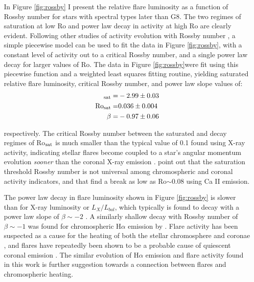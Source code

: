 \documentclass[twocolumn]{aastex6}
\begin{document}
In Figure \ref{fig:rossby} I present the relative flare luminosity as a function of Rossby number for stars with spectral types later than G8. The two regimes of saturation at low Ro and power law decay in activity at high Ro are clearly evident. Following other studies of activity evolution with Rossby number \citet[e.g.][]{wright2011}, a simple piecewise model can be used to fit the data in Figure \ref{fig:rossby}, with a constant level of activity out to a critical Rossby number, and a single power law decay for larger values of Ro. The data in Figure \ref{fig:rossby}were fit using this piecewise function and a weighted least squares fitting routine, yielding saturated relative flare luminosity, critical Rossby number, and power law slope values of:
\begin{eqnarray}
[\log (L_{fl} L_{Kp}^{-1})]_{\rm sat} =& -2.99 \pm 0.03 \notag \\
\rm{Ro_{sat}} =& 0.036 \pm 0.004 \notag \\
\beta = & -0.97 \pm 0.06 
\end{eqnarray}

\noindent
respectively. The critical Rossby number between the saturated and decay regimes of Ro$_{\rm sat}$ is much smaller than the typical value of 0.1 found using X-ray activity, indicating stellar flares become coupled to a star's angular momentum evolution {\it sooner} than the coronal X-ray emission \citep{pizzolato2003}. \citet{wright2011} point out that the saturation threshold Rossby number is not universal among chromospheric and coronal activity indicators, and that \citet{marsden2009} find a break as low as Ro$\sim$0.08 using Ca II emission.

The power law decay in flare luminosity shown in Figure \ref{fig:rossby} is slower than for X-ray luminosity or $L_{X}/L_{bol}$, which typically is found to decay with a power law slope of $\beta \sim-2$ \citet{wright2011}. A similarly shallow decay with Rossby number of  $\beta \sim-1$ was found for chromospheric H$\alpha$ emission by \citet{douglas2014}. Flare activity has been suspected as a cause for the heating of both the stellar chromosphere and coronae \citep{skumanich1985}, and flares have repeatedly been shown to be a probable cause of quiescent coronal emission \citep[e.g.][]{kashyap2002}. The similar evolution of H$\alpha$ emission and flare activity found in this work is further suggestion towards a connection between flares and chromospheric heating.
\end{document}
